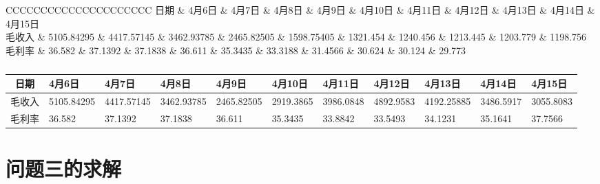 \documentclass[withoutpreface,bwprint]{cumcmthesis}
\begin{document}
\begin{table}[H]
    \caption{}
    \label{tab:gross_margin_prediction}
    \centering
    \fontsize{7}{9}\selectfont %
    \begin{tabularx}{\textwidth}{CCCCCCCCCCCCCCCCCCCCC} %
        \toprule[1.5pt]
        日期 & 4月6日 & 4月7日 & 4月8日 & 4月9日 & 4月10日 & 4月11日 & 4月12日 & 4月13日 & 4月14日 & 4月15日 \\
        \midrule[1pt]
        毛收入 & 5105.84295 & 4417.57145 & 3462.93785 & 2465.82505 & 1598.75405 & 1321.454 & 1240.456 & 1213.445 & 1203.779 & 1198.756 \\
        毛利率 & 36.582 & 37.1392 & 37.1838 & 36.611 & 35.3435 & 33.3188 & 31.4566 & 30.624 & 30.124 & 29.773 \\
        \bottomrule[1.5pt]
    \end{tabularx}
\end{table}

\begin{table}[H]
    \caption{}
    \label{tab:gross_margin_prediction}
    \centering
    \fontsize{7}{9}\selectfont %
    \begin{tabularx}{\textwidth}{c *{10}{X}} %
        \toprule[1.5pt]
        日期 & 4月6日 & 4月7日 & 4月8日 & 4月9日 & 4月10日 & 4月11日 & 4月12日 & 4月13日 & 4月14日 & 4月15日 \\
        \midrule[1pt]
        毛收入 & 5105.84295 & 4417.57145 & 3462.93785 & 2465.82505 & 2919.3865 & 3986.0848 & 4892.9583 & 4192.25885 & 3486.5917 & 3055.8083 \\
        毛利率 & 36.582 & 37.1392 & 37.1838 & 36.611 & 35.3435 & 33.8842 & 33.5493 & 34.1231 & 35.1641 & 37.7566 \\
        \bottomrule[1.5pt]
    \end{tabularx}
\end{table}

\section{问题三的求解}
\end{document}
